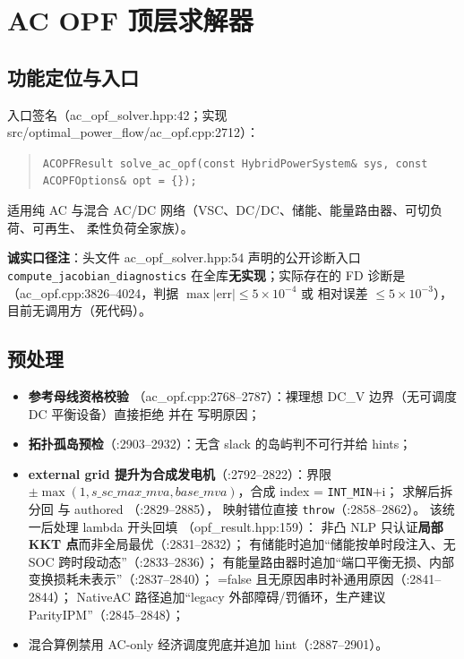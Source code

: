 \section{AC OPF 顶层求解器}\label{sec:acopf}

\subsection{功能定位与入口}
入口签名（ac\_opf\_solver.hpp:42；实现 src/optimal\_power\_flow/ac\_opf.cpp:2712）：
\begin{quote}\footnotesize
\texttt{ACOPFResult solve\_ac\_opf(const HybridPowerSystem\& sys, const ACOPFOptions\& opt = \{\});}
\end{quote}
适用纯 AC 与混合 AC/DC 网络（VSC、DC/DC、储能、能量路由器、可切负荷、可再生、
柔性负荷全家族）。

\textbf{诚实口径注}：头文件 ac\_opf\_solver.hpp:54 声明的公开诊断入口
\texttt{compute\_jacobian\_diagnostics} 在全库\textbf{无实现}；实际存在的 FD 诊断是
（ac\_opf.cpp:3826--4024，判据 $\max|\mathrm{err}|\le5\times10^{-4}$ 或
相对误差 $\le5\times10^{-3}$），目前无调用方（死代码）。

\subsection{预处理}
\begin{itemize}
  \item \textbf{参考母线资格校验} 
        （ac\_opf.cpp:2768--2787）：裸理想 DC\_V 边界（无可调度 DC 平衡设备）直接拒绝
        并在  写明原因；
  \item \textbf{拓扑孤岛预检}（:2903--2932）：无含 slack 的岛屿判不可行并给 hints；
  \item \textbf{external grid 提升为合成发电机}（:2792--2822）：界限
        $\pm\max(1, s\_sc\_max\_mva, base\_mva)$，合成 index = \texttt{INT\_MIN}+i；
        求解后拆分回  与 authored （:2829--2885），
        映射错位直接 \texttt{throw}（:2858--2862）。
        该统一后处理 lambda 开头回填 （opf\_result.hpp:159）：
        非凸 NLP 只认证\textbf{局部 KKT 点}而非全局最优（:2831--2832）；
        有储能时追加``储能按单时段注入、无 SOC 跨时段动态''（:2833--2836）；
        有能量路由器时追加``端口平衡无损、内部变换损耗未表示''（:2837--2840）；
        =false 且无原因串时补通用原因（:2841--2844）；
        NativeAC 路径追加``legacy 外部障碍/罚循环，生产建议 ParityIPM''（:2845--2848）；
  \item 混合算例禁用 AC-only 经济调度兜底并追加 hint（:2887--2901）。
\end{itemize}

